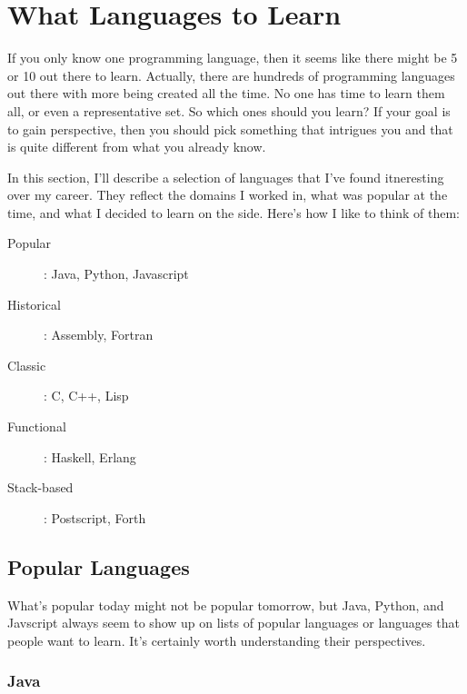 \section{What Languages to Learn}

If you only know one programming language, then it seems like there might be 5
or 10 out there to learn. Actually, there are hundreds of programming languages
out there with more being created all the time. No one has time to learn them
all, or even a representative set. So which ones should you learn? If your goal
is to gain perspective, then you should pick something that intrigues you and
that is quite different from what you already know.

In this section, I'll describe a selection of languages that I've found
itneresting over my career. They reflect the domains I worked in, what was
popular at the time, and what I decided to learn on the side.  Here's how I
like to think of them:

\begin{adjustwidth}{0.25in}{0in}
\begin{description}
    \item[Popular]: Java, Python, Javascript
    \item[Historical]: Assembly, Fortran
    \item[Classic]: C, C++, Lisp
    \item[Functional]: Haskell, Erlang
    \item[Stack-based]: Postscript, Forth
\end{description}
\end{adjustwidth}


\subsection{Popular Languages}

What's popular today might not be popular tomorrow, but Java, Python, and
Javscript always seem to show up on lists of popular languages or languages
that people want to learn. It's certainly worth understanding their
perspectives.

\subsubsection{Java}

